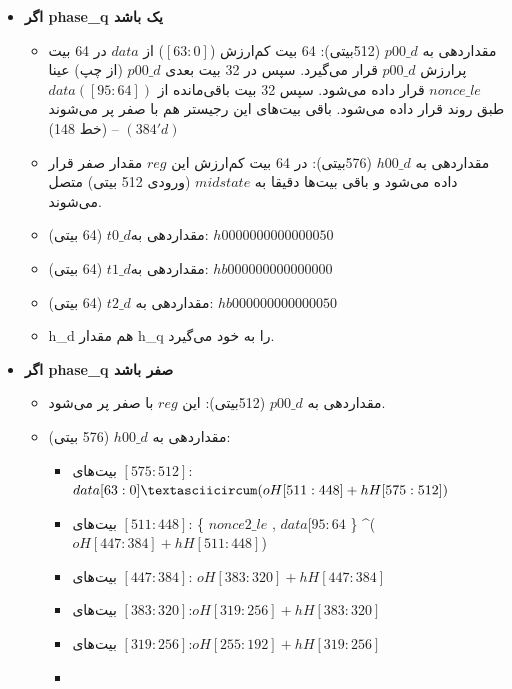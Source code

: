 \begin{itemize}
	\item
	      \textbf{اگر phase\_q یک باشد}
	      \begin{itemize}
	      	\item
	      	      مقداردهی به $p00\_d$ (512بیتی): 64 بیت کم‌ارزش ($[63:0]$) از $data$ در 64 بیت پرارزش $p00\_d$ قرار می‌گیرد. سپس در 32 بیت بعدی $p00\_d$ (از چپ) عینا $nonce\_le$ قرار داده می‌شود. سپس 32 بیت باقی‌مانده از $data ([95:64])$ طبق روند قرار داده می‌شود. باقی بیت‌های این رجیستر هم با صفر پر می‌شوند $(384'd)$ – (خط 148)
	      	\item
	      	      مقداردهی به $ h00\_d$ (576بیتی): در 64 بیت کم‌ارزش این $reg$ مقدار صفر قرار داده می‌شود و باقی بیت‌ها دقیقا به $midstate$ (ورودی 512 بیتی) متصل می‌شوند.
	      	\item
	      	      مقداردهی به$ t0\_d$ (64 بیتی): $h0000000000000050$
	      	\item
	      	      مقداردهی به$ t1\_d$ (64 بیتی): $hb000000000000000$
	      	\item
	      	      مقداردهی به $t2\_d$ (64 بیتی): $hb000000000000050$
	      	\item
	      	      h\_d هم مقدار h\_q را به خود می‌گیرد.
	      \end{itemize}
	\item
\textbf{	      اگر phase\_q صفر باشد
}	      \begin{itemize}
	      	\item
	      	      مقداردهی به $p00\_d$ (512بیتی): این $reg$ با صفر پر می‌شود.
	      	\item
	      	      مقداردهی به $h00\_d$ (576 بیتی):
	      	      \begin{itemize}
	      	      	\item
	      	      	      بیت‌های $[575:512]$:	
	      	      	      	$data[63:0] \textasciicircum ( oH[511:448] + hH[575:512])$
	      	      	\item
	      	      	      بیت‌های $[511:448]$: 
	      	      	      	\{ $nonce2\_le$ , $data[95:64$ \} \textasciicircum ( $oH[447:384] + hH[511:448]$)
	      	      	\item
	      	      	      بیت‌های $[447:384]$:  $	oH[383:320] + hH[447:384]$
	      	      	\item
	      	      	      بیت‌های $[383:320]$:$	oH[319:256] + hH[383:320]$
	      	      	\item
	      	      	      بیت‌های $[319:256]$:$	oH[255:192] + hH[319:256]$
	      	      	\item

\end{itemize}
\end{itemize}
\end{itemize}
